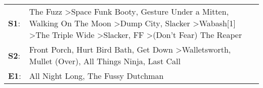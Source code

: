 \begin{supertabular}{p{0.03\textwidth}p{0.92\textwidth}}
 \textbf{S1}:  &  The Fuzz\textsuperscript{} \textgreater \enspace Space Funk Booty\textsuperscript{}, \enspace Gesture Under a Mitten\textsuperscript{}, \enspace Walking On The Moon\textsuperscript{} \textgreater \enspace Dump City\textsuperscript{}, \enspace Slacker\textsuperscript{} \textgreater \enspace Wabash[1]\textsuperscript{} \textgreater \enspace The Triple Wide\textsuperscript{} \textgreater \enspace Slacker\textsuperscript{}, \enspace FF\textsuperscript{} \textgreater \enspace (Don't Fear) The Reaper\textsuperscript{}  \enspace  \\
 \textbf{S2}:  &                                                                                                                                                                                                                                        Front Porch\textsuperscript{}, \enspace Hurt Bird Bath\textsuperscript{}, \enspace Get Down\textsuperscript{} \textgreater \enspace Walletsworth\textsuperscript{}, \enspace Mullet (Over)\textsuperscript{}, \enspace All Things Ninja\textsuperscript{}, \enspace Last Call\textsuperscript{}  \enspace  \\
 \textbf{E1}:  &                                                                                                                                                                                                                                                                                                                                                                                                                                                        All Night Long\textsuperscript{}, \enspace The Fussy Dutchman\textsuperscript{}  \enspace  \\
\end{supertabular}

